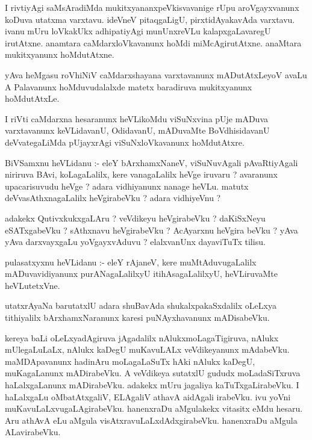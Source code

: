 \documentclass{article}
\begin{document}
\begin{mn}
I rivtiyAgi  saMsAradiMda  mukitxyananxpeVkisvavanige  rUpu  aroVgayxvanunx  koDuva  utatxma  
varxtavu.  ideVneV  pitaqgaLigU,  pirxtidAyakavAda  varxtavu.  ivanu  mUru  loVkakUkx  
adhipatiyAgi  munUnxreVLu  kalapxgaLavaregU  irutAtxne.  anamtara  caMdarxloVkavanunx  
hoMdi  miMcAgirutAtxne.  anaMtara  mukitxyanunx  hoMdutAtxne.
\end{mn}

\begin{mn}
yAva  heMgasu  roVhiNiV caMdarxshayana  varxtavanunx  mADutAtxLeyoV  avaLu  A  Palavanunx  
hoMduvudalalxde  matetx  baradiruva  mukitxyanunx  hoMdutAtxLe.
\end{mn}

\begin{mn}
I riVti  caMdarxna  hesaranunx  heVLikoMdu  viSuNxvina  pUje  mADuva  varxtavanunx  keVLidavanU,  
OdidavanU,  mADuvaMte  BoVdhisidavanU  deVvategaLiMda  pUjayxrAgi  viSuNxloVkavanunx  hoMdutAtxre.
\end{mn}

\begin{mn}
BiVSamxnu  heVLidanu :- eleY  bArxhamxNaneV,  viSuNuvAgali  pAvaRtiyAgali  niriruva  BAvi,  
koLagaLalilx,  kere  vanagaLalilx  heVge  iruvaru ?  avaranunx  upacarisuvudu  heVge ?  adara 
vidhiyanunx  nanage  heVLu.  matutx  deVvasAthxnagaLalilx  heVgirabeVku ?  adara  vidhiyeVnu ?
\end{mn}

\begin{mn}
adakekx  QutivxkukxgaLAru ?  veVdikeyu  heVgirabeVku ?  daKiSxNeyu  eSATxgabeVku ?  
sAthxnavu  heVgirabeVku ?  AcAyarxnu  heVgira  beVku ?  yAva  yAva  darxvayxgaLu  
yoVgayxvAduvu ?  elalxvanUnx  dayaviTuTx  tilisu.
\end{mn}

\begin{mn}
pulasatxyxnu  heVLidanu :- eleY  rAjaneV,  kere  muMtAduvugaLalilx  mADuvavidiyanunx  
purANagaLalilxyU  itihAsagaLalilxyU,  heVLiruvaMte  heVLutetxVne.
\end{mn}

\begin{mn}
utatxrAyaNa  barutatxlU  adara  shuBavAda  shukalxpakaSxdalilx  oLeLxya  tithiyalilx  
bArxhamxNaranunx  karesi  puNAyxhavanunx  mADisabeVku. 
\end{mn}

\begin{mn}
kereya  baLi  oLeLxyadAgiruva  jAgadalilx  nAlukxmoLagaTigiruva,  nAlukx  mUlegaLuLaLx,  
nAlukx  kaDegU  muKavuLALx  veVdikeyanunx  mAdabeVku.  maMDApavanunx  hadinAru  moLagaLaSuTx  
hAki  nAlukx  kaDegU,  muKagaLanunx  mADirabeVku.  A  veVdikeya  sutatxlU  gududx  
moLadaSiTxruva  haLalxgaLanunx  mADirabeVku.  adakekx  mUru  jagaliya  kaTuTxgaLirabeVku.  
I  haLalxgaLu  oMbatAtxgaliV,  ELAgaliV  athavA  aidAgali  irabeVku.  ivu  yoVni  
muKavuLaLxvugaLAgirabeVku.  hanenxraDu  aMgulakekx  vitasitx  eMdu  hesaru.  Aru  athAvA  
eLu  aMgula  visAtxravuLaLxdAdxgirabeVku.  hanenxraDu  aMgula  ALavirabeVku. 
\end{mn}
\end{document}
